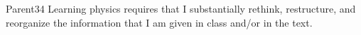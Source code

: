 \begin{question}{Parent34}
    \QuestionIndicative
    Learning physics requires that I substantially rethink, restructure,
        and reorganize the information that I am given in class and/or
        in the text.
    \begin{choiceshoriz}[o]
    \end{choiceshoriz}
\end{question}

